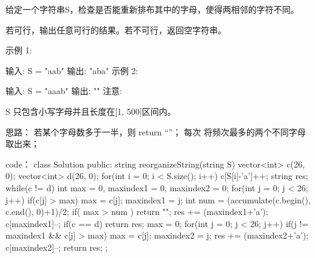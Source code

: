 给定一个字符串S，检查是否能重新排布其中的字母，使得两相邻的字符不同。

若可行，输出任意可行的结果。若不可行，返回空字符串。

示例 1:

输入: S = "aab"
输出: "aba"
示例 2:

输入: S = "aaab"
输出: ""
注意:

S 只包含小写字母并且长度在[1, 500]区间内。
























思路：
若某个字母数多于一半，则 return “”；
每次 将频次最多的两个不同字母取出来；




























code：
class Solution {
public:
    string reorganizeString(string S) {
        vector<int> c(26, 0);
        vector<int> d(26, 0);
        for(int i = 0; i < S.size(); i++) c[S[i]-'a']++;
        string res;
        while(c != d)
        {
            int max = 0, maxindex1 = 0, maxindex2 = 0;
            for(int j = 0; j < 26; j++)
            {
                if(c[j] > max)
                {
                    max = c[j]; maxindex1 = j;
                }
            }
            int num = (accumulate(c.begin(), c.end(), 0)+1)/2;
            if( max > num ) return "";
            res += (maxindex1+'a');
            c[maxindex1]--;
            if(c == d) return res;
            max = 0;
            for(int j = 0; j < 26; j++)
            {
                if(j != maxindex1 && c[j] > max)
                {
                    max = c[j]; maxindex2 = j;
                }
            }
            res += (maxindex2+'a');
            c[maxindex2]--;
        }
        return res;
    }
};